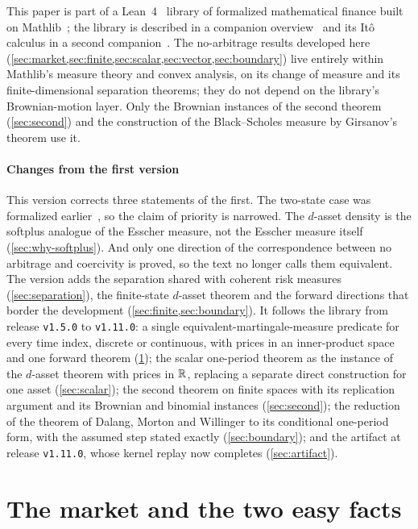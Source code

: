 \documentclass[11pt]{article}
\begin{document}
This paper is part of a Lean~4~\cite{deMouraUllrich2021} library of formalized mathematical finance
built on Mathlib~\cite{Mathlib2020}; the library is described in a companion
overview~\cite{CoelhoLibrary} and its It\^o calculus in a second companion~\cite{CoelhoIto}. The
no-arbitrage results developed here (\cref{sec:market,sec:finite,sec:scalar,sec:vector,sec:boundary}) live entirely within
Mathlib's measure theory and convex analysis, on its
 change of measure and its finite-dimensional separation theorems; they
do not depend on the library's Brownian-motion layer. Only the Brownian instances of the second theorem
(\cref{sec:second}) and the construction of the Black--Scholes measure by Girsanov's theorem use it.

\paragraph{Changes from the first version}
This version corrects three statements of the first. The two-state case was formalized
earlier~\cite{Nagy2026}, so the claim of priority is narrowed. The $d$-asset density is the softplus
analogue of the Esscher measure, not the Esscher measure itself (\cref{sec:why-softplus}). And only one
direction of the correspondence between no arbitrage and coercivity is proved, so the text no longer
calls them equivalent. The version adds the separation shared with coherent risk measures
(\cref{sec:separation}), the finite-state $d$-asset theorem and the forward directions that border the
development (\cref{sec:finite,sec:boundary}). It follows the library from release \texttt{v1.5.0} to
\texttt{v1.11.0}: a single equivalent-martingale-measure predicate for every time index, discrete or
continuous, with prices in an inner-product space and one forward theorem (\cref{sec:market}); the scalar
one-period theorem as the instance of the $d$-asset theorem with prices in $\mathbb{R}$, replacing a separate direct
construction for one asset (\cref{sec:scalar}); the second theorem on finite spaces with its replication argument
and its Brownian and binomial instances (\cref{sec:second}); the reduction of the theorem of Dalang, Morton and Willinger
to its conditional one-period form, with the assumed step stated exactly (\cref{sec:boundary}); and the artifact
at release \texttt{v1.11.0}, whose kernel replay now completes (\cref{sec:artifact}).

\section{The market and the two easy facts}\label{sec:market}
\end{document}
